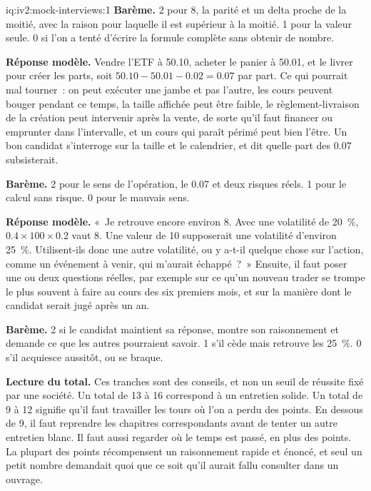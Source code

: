 \begin{solution}{iq:iv2:mock-interviews:1}
\textbf{Barème.} 2 pour 8, la parité et un delta proche de la moitié, avec la raison pour laquelle il est supérieur à la moitié. 1 pour la valeur seule. 0 si l'on a tenté d'écrire la formule complète sans obtenir de nombre.

\ivstop
\textbf{Réponse modèle.} Vendre l'ETF à 50.10, acheter le panier à 50.01, et le livrer pour créer les parts, soit $50.10 - 50.01 - 0.02 = 0.07$ par part. Ce qui pourrait mal tourner~: on peut exécuter une jambe et pas l'autre, les cours peuvent bouger pendant ce temps, la taille affichée peut être faible, le règlement-livraison de la création peut intervenir après la vente, de sorte qu'il faut financer ou emprunter dans l'intervalle, et un cours qui paraît périmé peut bien l'être. Un bon candidat s'interroge sur la taille et le calendrier, et dit quelle part des 0.07 subsisterait.

\textbf{Barème.} 2 pour le sens de l'opération, le 0.07 et deux risques réels. 1 pour le calcul sans risque. 0 pour le mauvais sens.

\ivstop
\textbf{Réponse modèle.} «~Je retrouve encore environ 8. Avec une volatilité de 20~\%, $0.4 \times 100 \times 0.2$ vaut 8. Une valeur de 10 supposerait une volatilité d'environ 25~\%. Utilisent-ils donc une autre volatilité, ou y a-t-il quelque chose sur l'action, comme un événement à venir, qui m'aurait échappé~?~» Ensuite, il faut poser une ou deux questions réelles, par exemple sur ce qu'un nouveau trader se trompe le plus souvent à faire au cours des six premiers mois, et sur la manière dont le candidat serait jugé après un an.

\textbf{Barème.} 2 si le candidat maintient sa réponse, montre son raisonnement et demande ce que les autres pourraient savoir. 1 s'il cède mais retrouve les 25~\%. 0 s'il acquiesce aussitôt, ou se braque.

\medskip
\textbf{Lecture du total.} Ces tranches sont des conseils, et non un seuil de réussite fixé par une société. Un total de 13 à 16 correspond à un entretien solide. Un total de 9 à 12 signifie qu'il faut travailler les tours où l'on a perdu des points. En dessous de 9, il faut reprendre les chapitres correspondants avant de tenter un autre entretien blanc. Il faut aussi regarder où le temps est passé, en plus des points. La plupart des points récompensent un raisonnement rapide et énoncé, et seul un petit nombre demandait quoi que ce soit qu'il aurait fallu consulter dans un ouvrage.


\end{solution}
